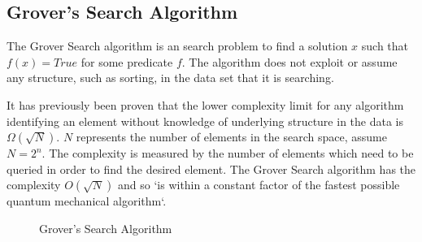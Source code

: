 \subsection{Grover's Search Algorithm}	
\label{sec:grovers}
The Grover Search algorithm\cite{Grover:1996rk} is an search problem to find a solution $x$ such that $f(x)=True$ for some predicate $f$.
The algorithm does not exploit or assume any structure, such as sorting, in the data set that it is searching.

It has previously been proven\cite{Bennett:1996iu} that the lower complexity limit for any algorithm identifying an element without knowledge of underlying structure in the data is $\Omega(\sqrt{N})$.
$N$ represents the number of elements in the search space, assume $N=2^n$.
The complexity is measured by the number of elements which need to be queried in order to find the desired element.
The Grover Search algorithm has the complexity $O(\sqrt{N})$ and so `is within a constant factor of the fastest possible quantum mechanical algorithm`\cite{Grover:1996rk}.

\begin{figure}
\begin{center}

\hspace{20pt}
 
\end{center}
\caption{Grover's Search Algorithm}
\end{figure}


